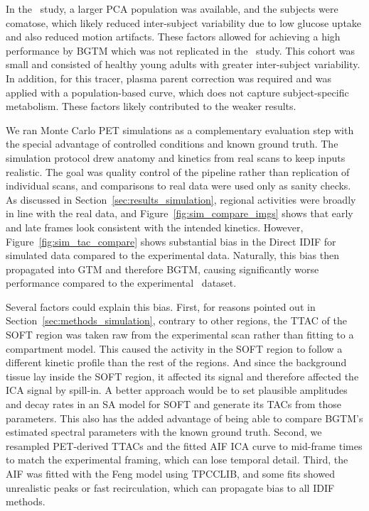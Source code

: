 In the \fdg\ study, a larger PCA population was available, and the subjects were comatose, which likely reduced inter-subject variability due to low glucose uptake and also reduced motion artifacts. %
These factors allowed for achieving a high performance by BGTM which was not replicated in the \yohimbine\ study.
This cohort was small and consisted of healthy young adults with greater inter-subject variability.
In addition, for this tracer, plasma parent correction was required and was applied with a population-based curve, which does not capture subject-specific metabolism.
These factors likely contributed to the weaker results.

We ran Monte Carlo PET simulations as a complementary evaluation step with the special advantage of controlled conditions and known ground truth. %
The simulation protocol drew anatomy and kinetics from real scans to keep inputs realistic.
The goal was quality control of the pipeline rather than replication of individual scans, and comparisons to real data were used only as sanity checks.
As discussed in Section~\ref{sec:results_simulation}, regional activities were broadly in line with the real data, and Figure~\ref{fig:sim_compare_imgs} shows that early and late frames look consistent with the intended kinetics. %
However, Figure~\ref{fig:sim_tac_compare} shows substantial bias in the Direct IDIF for simulated data compared to the experimental data.
Naturally, this bias then propagated into GTM and therefore BGTM, causing significantly worse performance compared to the experimental \fdg\ dataset. %

Several factors could explain this bias.
First, for reasons pointed out in Section~\ref{sec:methods_simulation}, contrary to other regions, the TTAC of the SOFT region was taken raw from the experimental scan rather than fitting to a compartment model. %
This caused the activity in the SOFT region to follow a different kinetic profile than the rest of the regions.
And since the background tissue lay inside the SOFT region, it affected its signal and therefore affected the ICA signal by spill-in. %
A better approach would be to set plausible amplitudes and decay rates in an SA model for SOFT and generate its TACs from those parameters. %
This also has the added advantage of being able to compare BGTM’s estimated spectral parameters with the known ground truth.
Second, we resampled PET-derived TTACs and the fitted AIF ICA curve to mid-frame times to match the experimental framing, which can lose temporal detail.
Third, the AIF was fitted with the Feng model using TPCCLIB, and some fits showed unrealistic peaks or fast recirculation, which can propagate bias to all IDIF methods.

